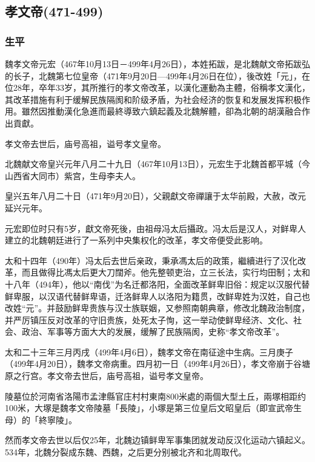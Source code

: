 
\subsection{孝文帝\tiny(471-499)}

\subsubsection{生平}

魏孝文帝元宏（467年10月13日－499年4月26日），本姓拓跋，是北魏献文帝拓跋弘的长子，北魏第七位皇帝（471年9月20日—499年4月26日在位），後改姓「元」，在位28年，卒年33岁，其所推行的孝文帝改革，以漢化運動為主體，俗稱孝文漢化，其改革措施有利于缓解民族隔阂和阶级矛盾，为社会经济的恢复和发展发挥积极作用。雖然因推動漢化急進而最終導致六鎮起義及北魏解體，卻為北朝的胡漢融合作出貢獻。

孝文帝去世后，庙号高祖，谥号孝文皇帝。

北魏献文帝皇兴元年八月二十九日（467年10月13日），元宏生于北魏首都平城（今山西省大同市）紫宫，生母李夫人。

皇兴五年八月二十日（471年9月20日），父親獻文帝禪讓于太华前殿，大赦，改元延兴元年。

元宏即位时只有5岁，獻文帝死後，由祖母冯太后攝政。冯太后是汉人，对鲜卑人建立的北魏朝廷进行了一系列中央集权化的改革，孝文帝便受此影响。

太和十四年（490年）冯太后去世后亲政，秉承馮太后的政策，繼續进行了汉化改革，而且做得比馮太后更大刀闊斧。他先整顿吏治，立三长法，实行均田制；太和十八年（494年），他以“南伐”为名迁都洛阳，全面改革鲜卑旧俗：规定以汉服代替鲜卑服，以汉语代替鲜卑语，迁洛鲜卑人以洛阳为籍贯，改鲜卑姓为汉姓，自己也改姓“元”。并鼓励鲜卑贵族与汉士族联姻，又参照南朝典章，修改北魏政治制度，并严厉镇压反对改革的守旧贵族，处死太子恂，这一举动使鲜卑经济、文化、社会、政治、军事等方面大大的发展，缓解了民族隔阂，史称“孝文帝改革”。

太和二十三年三月丙戌（499年4月6日），魏孝文帝在南征途中生病。三月庚子（499年4月20日），魏孝文帝病重。四月初一日（499年4月26日），孝文帝崩于谷塘原之行宫。孝文帝去世后，庙号高祖，谥号孝文皇帝。

陵墓位於河南省洛陽市孟津縣官庄村村東南800米處的兩個大型土丘，兩塚相距约100米，大塚是魏孝文帝陵墓「長陵」，小塚是第三位皇后文昭皇后（即宣武帝生母）的「終寧陵」。

然而孝文帝去世以后仅25年，北魏边镇鲜卑军事集团就发动反汉化运动六镇起义。534年，北魏分裂成东魏、西魏，之后更分别被北齐和北周取代。

